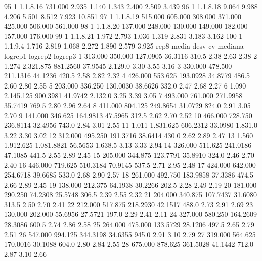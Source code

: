 \documentclass[12pt]{article}
\begin{document}
\begin{Schunk}
\begin{Soutput}
95      1     1.1.8.16 731.000   2.935   1.140   1.343   2.400   2.509   3.439
96      1     1.1.8.18   9.064   9.988   4.206   5.501   8.512   7.923  10.851
97      1     1.1.8.19 515.000 605.000 308.000 371.000 425.000 506.000 561.000
98      1     1.1.8.20 137.000 248.000 130.000 149.000 182.000 157.000 176.000
99      1     1.1.8.21   1.972   2.793   1.036   1.319   2.831   3.183   3.162
100     1      1.1.9.4   1.716   2.819   1.068   2.272   1.890   2.579   3.925
       rep8      media       desv      cv  mediana logrep1 logrep2 logrep3
1   313.000    350.000   127.0905 36.3116    310.5    2.38    2.63    2.38
2     1.274  2.321.875   881.2560 37.9545  2.129.0    3.30    3.55    3.16
3   330.000    478.500   211.1316 44.1236    420.5    2.58    2.82    2.32
4   426.000    553.625   193.0928 34.8779    486.5    2.60    2.80    2.55
5   203.000    336.250   130.0030 38.6626    332.0    2.47    2.68    2.27
6     1.090  2.145.125   900.3981 41.9742  2.132.0    3.25    3.39    3.05
7   493.000    761.000   271.9958 35.7419    769.5    2.80    2.96    2.64
8   411.000    804.125   249.8654 31.0729    824.0    2.91    3.05    2.70
9   141.000    346.625   164.9813 47.5965    312.5    2.62    2.70    2.52
10  466.000    728.750   236.8114 32.4956    743.0    2.84    3.01    2.55
11    1.011  1.831.625   606.2312 33.0980  1.831.0    3.22    3.30    3.02
12  312.000    495.250   191.3716 38.6414    430.0    2.62    2.89    2.47
13    1.560  1.912.625 1.081.8821 56.5653  1.638.5    3.13    3.33    2.94
14  326.000    511.625   241.0186 47.1085    441.5    2.55    2.89    2.45
15  205.000    344.875   123.7791 35.8910    324.0    2.46    2.70    2.40
16  446.000    719.625   510.3184 70.9145    537.5    2.71    2.95    2.48
17  424.000    642.000   254.6718 39.6685    533.0    2.68    2.90    2.57
18  261.000    492.750   183.9858 37.3386    474.5    2.66    2.89    2.45
19  138.000    212.375    64.1938 30.2266    202.5    2.28    2.49    2.19
20  181.000    290.250    74.2308 25.5748    306.5    2.39    2.55    2.32
21  204.000    340.875   107.7437 31.6080    313.5    2.50    2.70    2.41
22  212.000    517.875   218.2930 42.1517    488.0    2.73    2.91    2.69
23  130.000    202.000    55.6956 27.5721    197.0    2.29    2.41    2.11
24  327.000    580.250   164.2609 28.3086    600.5    2.74    2.86    2.58
25  264.000    475.000   133.5729 28.1206    497.5    2.65    2.79    2.51
26  547.000    994.125   344.3198 34.6355    945.0    2.91    3.10    2.79
27  319.000    564.625   170.0016 30.1088    604.0    2.80    2.84    2.55
28  675.000    878.625   361.5028 41.1442    712.0    2.87    3.10    2.66

\end{Soutput}
\end{Schunk}
\end{document}
